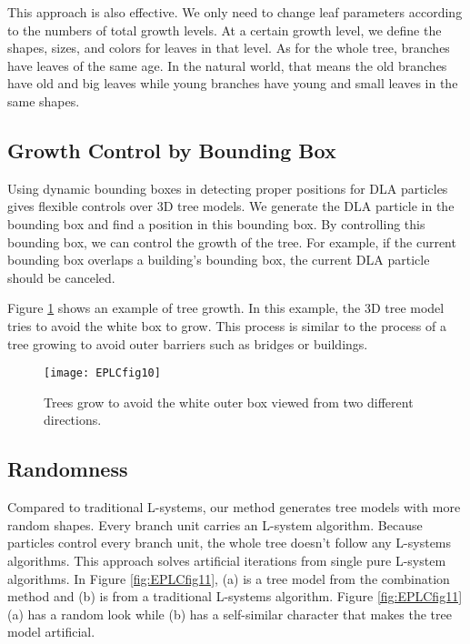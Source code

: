 This approach is also effective. We only need to change leaf parameters according to the numbers of total growth levels. At a certain growth level, we define the shapes, sizes, and colors for leaves in that level. As for the whole tree, branches have leaves of the same age. In the natural world, that means the old branches have old and big leaves while young branches have young and small leaves in the same shapes.

\subsection{Growth Control by Bounding Box}

Using dynamic bounding boxes in detecting proper positions for DLA particles gives flexible controls over 3D tree models. We generate the DLA particle in the bounding box and find a position in this bounding box. By controlling this bounding box, we can control the growth of the tree. For example, if the current bounding box overlaps a building's bounding box, the current DLA particle should be canceled.

Figure \ref{fig:EPLCfig10} shows an example of tree growth. In this example, the 3D tree model tries to avoid the white box to grow. This process is similar to the process of a tree growing to avoid outer barriers such as bridges or buildings.

\begin{figure}[!t]
\centering
\texttt{[image: EPLCfig10]}
\caption[Simulate tree growth. ]{Trees grow to avoid the white outer box viewed from two different directions.}
\label{fig:EPLCfig10}
\end{figure} 

\subsection{Randomness}

Compared to traditional L-systems, our method generates tree models with more random shapes. Every branch unit carries an L-system algorithm. Because particles control every branch unit, the whole tree doesn't follow any L-systems algorithms. This approach solves artificial iterations from single pure L-system algorithms. In Figure \ref{fig:EPLCfig11}, (a) is a tree model from the combination method and (b) is from a traditional L-systems algorithm. Figure \ref{fig:EPLCfig11}(a) has a random look while (b) has a self-similar character that makes the tree model artificial.

